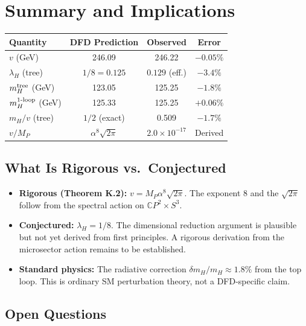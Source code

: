 \documentclass[11pt]{article}
\theoremstyle{definition}
\begin{document}
\section{Summary and Implications}
\label{sec:summary}

\begin{center}
\renewcommand{\arraystretch}{1.4}
\begin{tabular}{p{5cm}ccc}
\toprule
Quantity & DFD Prediction & Observed & Error \\
\midrule
$v$ (GeV) & 246.09 & 246.22 & $-0.05\%$ \\
$\lambda_H$ (tree) & $1/8 = 0.125$ & $0.129$ (eff.) & $-3.4\%$ \\
$m_H^{\rm tree}$ (GeV) & 123.05 & 125.25 & $-1.8\%$ \\
$m_H^{\rm 1\text{-}loop}$ (GeV) & 125.33 & 125.25 & $+0.06\%$ \\
$m_H/v$ (tree) & $1/2$ (exact) & 0.509 & $-1.7\%$ \\
$v/M_P$ & $\alpha^8\sqrt{2\pi}$ & $2.0 \times 10^{-17}$ & Derived \\
\bottomrule
\end{tabular}
\end{center}

\subsection{What Is Rigorous vs.\ Conjectured}

\begin{itemize}
\item \textbf{Rigorous (Theorem K.2):} $v = M_P \alpha^8 \sqrt{2\pi}$.
      The exponent 8 and the $\sqrt{2\pi}$ follow from the spectral
      action on $\mathbb{C}P^2 \times S^3$.
\item \textbf{Conjectured:} $\lambda_H = 1/8$. The dimensional
      reduction argument is plausible but not yet derived from first
      principles. A rigorous derivation from the microsector action
      remains to be established.
\item \textbf{Standard physics:} The radiative correction
      $\delta m_H / m_H \approx 1.8\%$ from the top loop. This is
      ordinary SM perturbation theory, not a DFD-specific claim.
\end{itemize}

\subsection{Open Questions}
\end{document}
